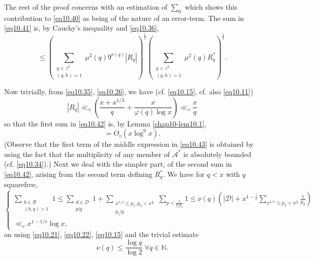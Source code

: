 The rest of the proof concerns with an estimation of $\sum_0$ which
shows this contribution to \eqref{eq10.40} as being of the nature of
an error-term. The sum in \eqref{eq10.41} is, by Cauchy's inequality
and \eqref{eq10.36}, 
\begin{equation*}
\leq (\sum_{\substack{q < z^2 \\ (q, h)=1}} \mu^2 (q) 9^{\nu
  (q)}|R_q|)^{\frac{1}{2}} (\sum_{\substack{q < z^2 \\ (q, h)=1}}
\mu^2 (q) R^*_q)^{\frac{1}{2}}. \tag{10.42}\label{eq10.42} 
\end{equation*}  
  
Now trivially, from \eqref{eq10.35}, \eqref{eq10.26}, we have
(cf. \eqref{eq10.15}, cf.  also \eqref{eq10.11}) 
\begin{equation*}
|R_q| \ll_v (\frac{x+x^{1/3}}{q}+ \frac{x}{\varphi (q) \log x}) \ll_v
\frac{x}{q} \tag{10.43}\label{eq10.43} 
\end{equation*}
so that the first sum in \eqref{eq10.42} is, by Lemma
\ref{chap10-lem10.1}, 
\begin{equation*}
= O_v (x \log ^9 x). \tag{10.44}\label{eq10.44}
\end{equation*}
(Observe that the first term of the middle expression in \eqref{eq10.43} is
obtained by using the fact that the multiplicity of any member of
$\mathcal{A}^*$ is absolutely bounded (cf. \eqref{eq10.34}).) Next we deal
with the simpler part, of the second sum in \eqref{eq10.42}, arising from
the second term defining $R^*_q$. We have  for $q < x$ with $q$
squarefree,  
{\fontsize{10}{12}\selectfont
\begin{equation*}
\begin{cases}
\sum\limits_{\substack{b \in \mathscr{B} \\(b,q)>1}} 1 \leq
\sum\limits_{\substack{d \in \mathscr{D}\\ p|q}} 1 +
\sum\limits_{\substack{x^{1/v} \leq p_1 , p_2 < x^{\frac{1}{2}} \\ p_1 |q}}
\sum\limits_{p<\frac{x}{p_1 p_2}} 1 \leq \nu (q) (|\mathscr{D}|+ x ^{1
  - \frac{1}{v}} \sum\limits_{x^{1/v}\leq p_2 < x ^{\frac{1}{2}}}
\frac{1}{p_2})\\ \ll_v x^{1-1/v} \log x, 
\end{cases}\tag{10.45}\label{eq10.45}
\end{equation*}}
on using \eqref{eq10.21}, \eqref{eq10.22}, \eqref{eq10.15} and the
trivial estimate 
\begin{equation*}
\nu (q) \leq \frac{\log q}{\log 2} \; \forall q \in
\mathbb{N}. \tag{10.46}\label{eq10.46} 
\end{equation*}\pageoriginale

